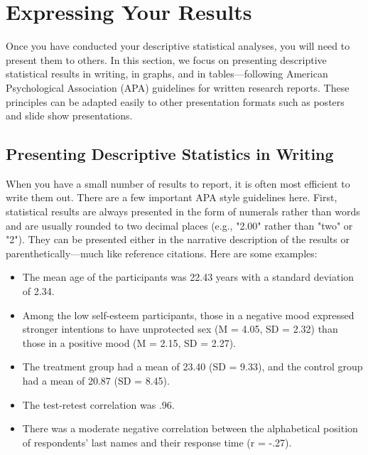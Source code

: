 \section{Expressing Your Results}


Once you have conducted your descriptive statistical analyses, you will need to present them to others. In this section, we focus on presenting descriptive statistical results in writing, in graphs, and in tables---following American Psychological Association (APA) guidelines for written research reports. These principles can be adapted easily to other presentation formats such as posters and slide show presentations.


\subsection{Presenting Descriptive Statistics in Writing}

When you have a small number of results to report, it is often most efficient to write them out. There are a few important APA style guidelines here. First, statistical results are always presented in the form of numerals rather than words and are usually rounded to two decimal places (e.g., "2.00" rather than "two" or "2"). They can be presented either in the narrative description of the results or parenthetically---much like reference citations. Here are some examples:

\begin{itemize}
\item The mean age of the participants was 22.43 years with a standard deviation of 2.34.
\item Among the low self-esteem participants, those in a negative mood expressed stronger intentions to have unprotected sex (M = 4.05, SD = 2.32) than those in a positive mood (M = 2.15, SD = 2.27).
\item The treatment group had a mean of 23.40 (SD = 9.33), and the control group had a mean of 20.87 (SD = 8.45).
\item The test-retest correlation was .96.
\item There was a moderate negative correlation between the alphabetical position of respondents' last names and their response time (r = -.27).
\end{itemize}


